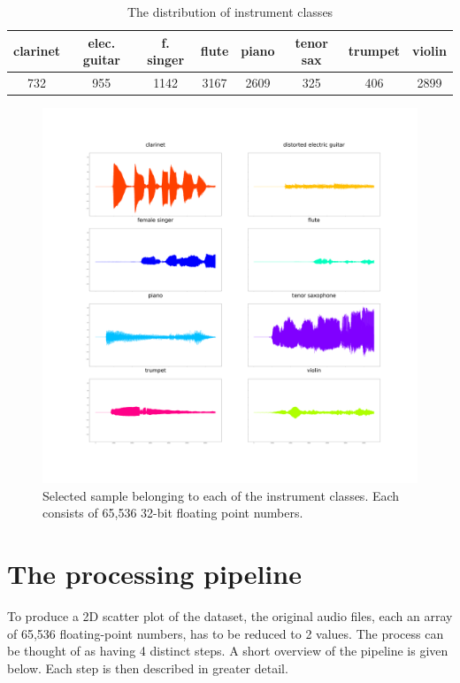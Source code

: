 \documentclass[a4paper, 12pt, twoside]{report}
\begin{document}
\begin{table}[h!b]
\centering
\begin{tabular}{ |c|c|c|c|c|c|c|c| }
\hline
clarinet & elec. guitar & f. singer & flute & piano & tenor sax & trumpet & violin \\
\hline
732 & 955 & 1142 & 3167 & 2609 & 325 & 406 & 2899 \\
\hline
\end{tabular}
\caption{\label{table:distr_of_sounds}The distribution of instrument classes}
\end{table}

\begin{figure}[h!]
\centering
\includegraphics[width=.9\linewidth]{./Figures/8_samples.png}
\caption{Selected sample belonging to each of the instrument classes. Each consists of 65,536 32-bit floating point numbers.}
\label{fig:8-plots}
\end{figure}

\section{The processing pipeline}
\label{sec:org82c3cb3}

To produce a 2D scatter plot of the dataset, the original audio files, each an array of 65,536 floating-point numbers, has to be reduced to 2 values.
The process can be thought of as having 4 distinct steps. A short overview of the pipeline is given below. Each step is then described in greater detail.
\end{document}
